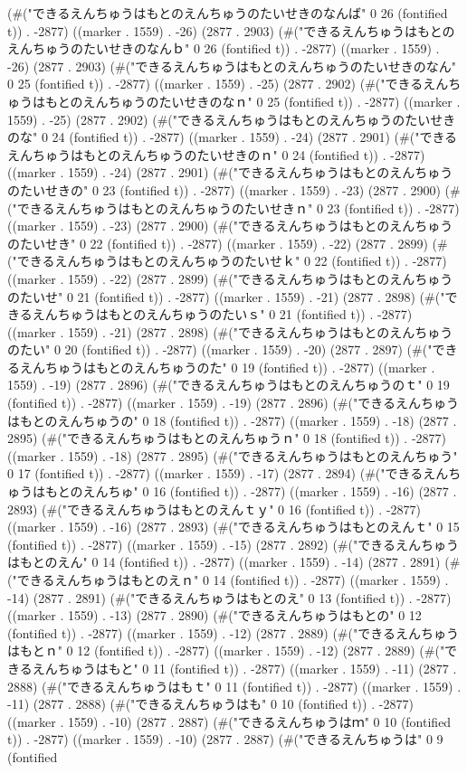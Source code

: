 {(#("できるえんちゅうはもとのえんちゅうのたいせきのなんば" 0 26 (fontified t)) . -2877) ((marker . 1559) . -26) (2877 . 2903) (#("できるえんちゅうはもとのえんちゅうのたいせきのなんｂ" 0 26 (fontified t)) . -2877) ((marker . 1559) . -26) (2877 . 2903) (#("できるえんちゅうはもとのえんちゅうのたいせきのなん" 0 25 (fontified t)) . -2877) ((marker . 1559) . -25) (2877 . 2902) (#("できるえんちゅうはもとのえんちゅうのたいせきのなｎ" 0 25 (fontified t)) . -2877) ((marker . 1559) . -25) (2877 . 2902) (#("できるえんちゅうはもとのえんちゅうのたいせきのな" 0 24 (fontified t)) . -2877) ((marker . 1559) . -24) (2877 . 2901) (#("できるえんちゅうはもとのえんちゅうのたいせきのｎ" 0 24 (fontified t)) . -2877) ((marker . 1559) . -24) (2877 . 2901) (#("できるえんちゅうはもとのえんちゅうのたいせきの" 0 23 (fontified t)) . -2877) ((marker . 1559) . -23) (2877 . 2900) (#("できるえんちゅうはもとのえんちゅうのたいせきｎ" 0 23 (fontified t)) . -2877) ((marker . 1559) . -23) (2877 . 2900) (#("できるえんちゅうはもとのえんちゅうのたいせき" 0 22 (fontified t)) . -2877) ((marker . 1559) . -22) (2877 . 2899) (#("できるえんちゅうはもとのえんちゅうのたいせｋ" 0 22 (fontified t)) . -2877) ((marker . 1559) . -22) (2877 . 2899) (#("できるえんちゅうはもとのえんちゅうのたいせ" 0 21 (fontified t)) . -2877) ((marker . 1559) . -21) (2877 . 2898) (#("できるえんちゅうはもとのえんちゅうのたいｓ" 0 21 (fontified t)) . -2877) ((marker . 1559) . -21) (2877 . 2898) (#("できるえんちゅうはもとのえんちゅうのたい" 0 20 (fontified t)) . -2877) ((marker . 1559) . -20) (2877 . 2897) (#("できるえんちゅうはもとのえんちゅうのた" 0 19 (fontified t)) . -2877) ((marker . 1559) . -19) (2877 . 2896) (#("できるえんちゅうはもとのえんちゅうのｔ" 0 19 (fontified t)) . -2877) ((marker . 1559) . -19) (2877 . 2896) (#("できるえんちゅうはもとのえんちゅうの" 0 18 (fontified t)) . -2877) ((marker . 1559) . -18) (2877 . 2895) (#("できるえんちゅうはもとのえんちゅうｎ" 0 18 (fontified t)) . -2877) ((marker . 1559) . -18) (2877 . 2895) (#("できるえんちゅうはもとのえんちゅう" 0 17 (fontified t)) . -2877) ((marker . 1559) . -17) (2877 . 2894) (#("できるえんちゅうはもとのえんちゅ" 0 16 (fontified t)) . -2877) ((marker . 1559) . -16) (2877 . 2893) (#("できるえんちゅうはもとのえんｔｙ" 0 16 (fontified t)) . -2877) ((marker . 1559) . -16) (2877 . 2893) (#("できるえんちゅうはもとのえんｔ" 0 15 (fontified t)) . -2877) ((marker . 1559) . -15) (2877 . 2892) (#("できるえんちゅうはもとのえん" 0 14 (fontified t)) . -2877) ((marker . 1559) . -14) (2877 . 2891) (#("できるえんちゅうはもとのえｎ" 0 14 (fontified t)) . -2877) ((marker . 1559) . -14) (2877 . 2891) (#("できるえんちゅうはもとのえ" 0 13 (fontified t)) . -2877) ((marker . 1559) . -13) (2877 . 2890) (#("できるえんちゅうはもとの" 0 12 (fontified t)) . -2877) ((marker . 1559) . -12) (2877 . 2889) (#("できるえんちゅうはもとｎ" 0 12 (fontified t)) . -2877) ((marker . 1559) . -12) (2877 . 2889) (#("できるえんちゅうはもと" 0 11 (fontified t)) . -2877) ((marker . 1559) . -11) (2877 . 2888) (#("できるえんちゅうはもｔ" 0 11 (fontified t)) . -2877) ((marker . 1559) . -11) (2877 . 2888) (#("できるえんちゅうはも" 0 10 (fontified t)) . -2877) ((marker . 1559) . -10) (2877 . 2887) (#("できるえんちゅうはｍ" 0 10 (fontified t)) . -2877) ((marker . 1559) . -10) (2877 . 2887) (#("できるえんちゅうは" 0 9 (fontified }
